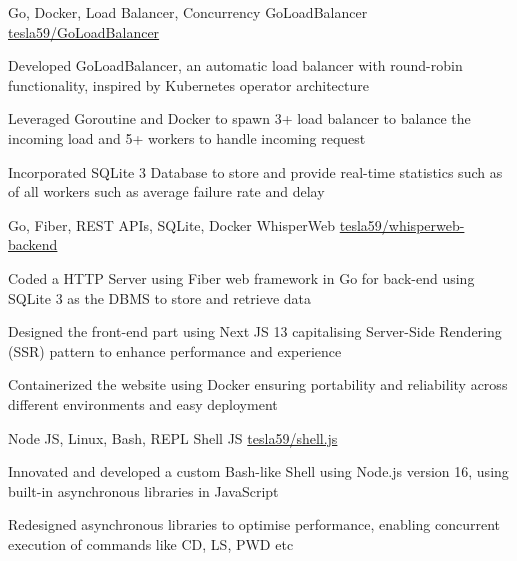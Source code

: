 \documentclass[]{awesome-cv}
\begin{document}
\begin{cventries}
    \cventry
    {Go, Docker, Load Balancer, Concurrency}
    {GoLoadBalancer}
    {\href{https://github.com/tesla59/GoLoadBalancer}{tesla59/GoLoadBalancer}}
    {}
    {\begin{cvitems}
            \item Developed GoLoadBalancer, an automatic load balancer with round-robin functionality, inspired by Kubernetes operator architecture
            \item Leveraged Goroutine and Docker to spawn 3+ load balancer to balance the incoming load and 5+ workers to handle incoming request
            \item Incorporated SQLite 3 Database to store and provide real-time statistics such as of all workers such as average failure rate and delay
        \end{cvitems}}

    \vspace{-5mm}
    \cventry
    {Go, Fiber, REST APIs, SQLite, Docker}
    {WhisperWeb}
    {\href{https://github.com/tesla59/whisperweb-backend}{tesla59/whisperweb-backend}}
    {}
    {\begin{cvitems}
            \item Coded a HTTP Server using Fiber web framework in Go for back-end using SQLite 3 as the DBMS to store and retrieve data
            \item Designed the front-end part using Next JS 13 capitalising Server-Side Rendering (SSR) pattern to enhance performance and experience
            \item Containerized the website using Docker ensuring portability and reliability across different environments and easy deployment
        \end{cvitems}}

    \vspace{-5mm}
    \cventry
    {Node JS, Linux, Bash, REPL}
    {Shell JS}
    {\href{https://github.com/tesla59/shell.js}{tesla59/shell.js}}
    {}
    {\begin{cvitems}
            \item Innovated and developed a custom Bash-like Shell using Node.js version 16, using built-in asynchronous libraries in JavaScript
            \item Redesigned asynchronous libraries to optimise performance, enabling concurrent execution of commands like CD, LS, PWD etc
        \end{cvitems}}


\end{cventries}
\end{document}
